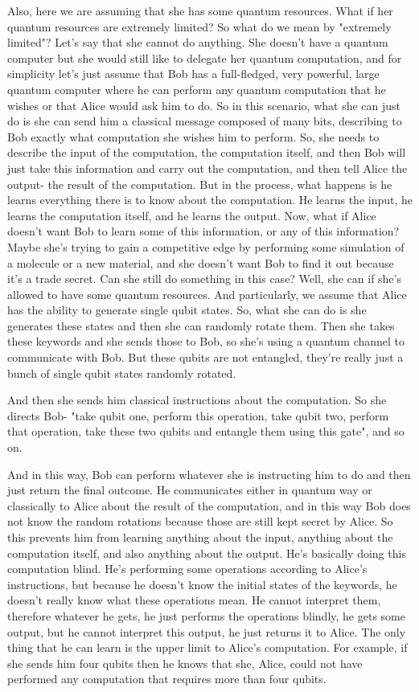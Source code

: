 Also, here we are assuming that she has some quantum resources. What if her quantum resources are extremely limited? So what do we mean by "extremely limited"? Let's say that she cannot do anything. She doesn't have a quantum computer but she would still like to delegate her quantum computation, and for simplicity let's just assume that Bob has a full-fledged, very powerful, large quantum computer where he can perform any quantum computation that he wishes or that Alice would ask him to do. So in this scenario, what she can just do is she can send him a classical message composed of many bits, describing to Bob exactly what computation she wishes him to perform. So, she needs to describe the input of the computation, the computation itself, and then Bob will just take this information and carry out the computation, and then tell Alice the output- the result of the computation. But in the process, what happens is he learns everything there is to know about the computation. He learns the input, he learns the computation itself, and he learns the output. Now, what if Alice doesn't want Bob to learn some of this information, or any of this information? Maybe she's trying to gain a competitive edge by performing some simulation of a molecule or a new material, and she doesn't want Bob to find it out because it's a trade secret. Can she still do something in this case? Well, she can if she's allowed to have some quantum resources. And particularly, we assume that Alice has the ability to generate single qubit states. So, what she can do is she generates these states and then she can randomly rotate them. Then she takes these keywords and she sends those to Bob, so she's using a quantum channel to communicate with Bob. But these qubits are not entangled, they're really just a bunch of single qubit states randomly rotated.

And then she sends him classical instructions about the computation. So she directs Bob- "take qubit one, perform this operation, take qubit two, perform that operation, take these two qubits and entangle them using this gate", and so on.

And in this way, Bob can perform whatever she is instructing him to do and then just return the final outcome. He communicates either in quantum way or classically to Alice about the result of the computation, and in this way Bob does not know the random rotations because those are still kept secret by Alice. So this prevents him from learning anything about the input, anything about the computation itself, and also anything about the output. He's basically doing this computation blind. He's performing some operations according to Alice's instructions, but because he doesn't know the initial states of the keywords, he doesn't really know what these operations mean. He cannot interpret them, therefore whatever he gets, he just performs the operations blindly, he gets some output, but he cannot interpret this output, he just returns it to Alice. The only thing that he can learn is the upper limit to Alice's computation. For example, if she sends him four qubits then he knows that she, Alice, could not have performed any computation that requires more than four qubits.




